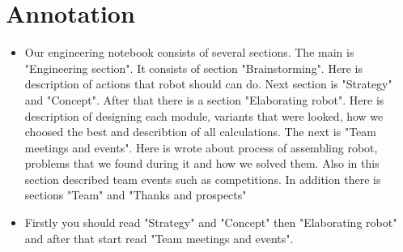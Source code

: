 \section{Annotation}
\begin{itemize}
\item Our engineering notebook consists of several sections. The main is "Engineering section". It consists of section "Brainstorming". Here is description of actions that robot should can do. Next section is "Strategy" and "Concept". After that there is a section  "Elaborating robot". Here is description of designing each module, variants that were looked, how we choosed the best and describtion of all calculations. The next is "Team meetings and events". Here is wrote about process of assembling robot, problems that we found during it and how we solved them. Also in this section described team events such as competitions. In addition there is sections "Team" and "Thanks and prospects"
\item Firstly you should read "Strategy" and "Concept" then "Elaborating robot" and after that start read "Team meetings and events".
\end{itemize}
\fillpage